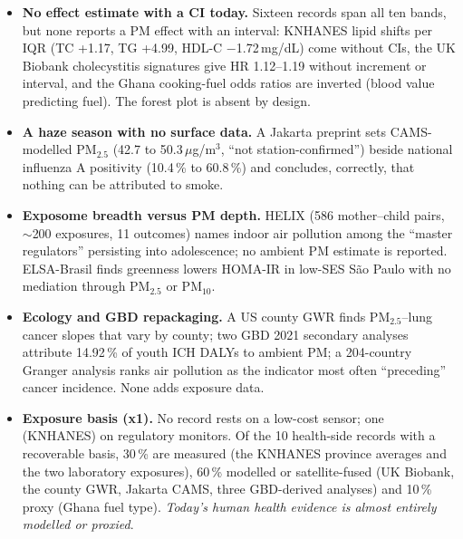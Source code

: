 \documentclass[10pt]{article}
\begin{document}
\footnotesize
\begin{itemize}

\item \textbf{No effect estimate with a CI today.} Sixteen records span all ten bands, but none reports a PM effect with an interval: KNHANES lipid shifts per IQR (TC +1.17, TG +4.99, HDL-C $-$1.72\,mg/dL) come without CIs, the UK Biobank cholecystitis signatures give HR 1.12--1.19 without increment or interval, and the Ghana cooking-fuel odds ratios are inverted (blood value predicting fuel). The forest plot is absent by design.

\item \textbf{A haze season with no surface data.} A Jakarta preprint sets CAMS-modelled PM$_{2.5}$ (42.7 to 50.3\,$\mu$g/m$^3$, ``not station-confirmed'') beside national influenza A positivity (10.4\,\% to 60.8\,\%) and concludes, correctly, that nothing can be attributed to smoke.

\item \textbf{Exposome breadth versus PM depth.} HELIX (586 mother--child pairs, $\sim$200 exposures, 11 outcomes) names indoor air pollution among the ``master regulators'' persisting into adolescence; no ambient PM estimate is reported. ELSA-Brasil finds greenness lowers HOMA-IR in low-SES S\~ao Paulo with no mediation through PM$_{2.5}$ or PM$_{10}$.

\item \textbf{Ecology and GBD repackaging.} A US county GWR finds PM$_{2.5}$--lung cancer slopes that vary by county; two GBD 2021 secondary analyses attribute 14.92\,\% of youth ICH DALYs to ambient PM; a 204-country Granger analysis ranks air pollution as the indicator most often ``preceding'' cancer incidence. None adds exposure data.

\item \textbf{Exposure basis (x1).} No record rests on a low-cost sensor; one (KNHANES) on regulatory monitors. Of the 10 health-side records with a recoverable basis, 30\,\% are measured (the KNHANES province averages and the two laboratory exposures), 60\,\% modelled or satellite-fused (UK Biobank, the county GWR, Jakarta CAMS, three GBD-derived analyses) and 10\,\% proxy (Ghana fuel type). \emph{Today's human health evidence is almost entirely modelled or proxied}.

\end{itemize}

\vspace{2mm}
\end{document}
